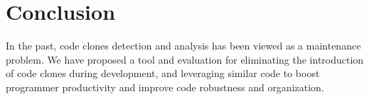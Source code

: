 \documentclass[preprint,10pt]{sigplanconf}
\begin{document}
\section{Conclusion}

In the past, code clones detection and analysis has been viewed as a
maintenance problem. 
We have proposed a tool and evaluation for
eliminating the introduction of code clones during development, and
leveraging similar code to boost programmer productivity and improve
code robustness and organization.

%

%
%
\end{document}
